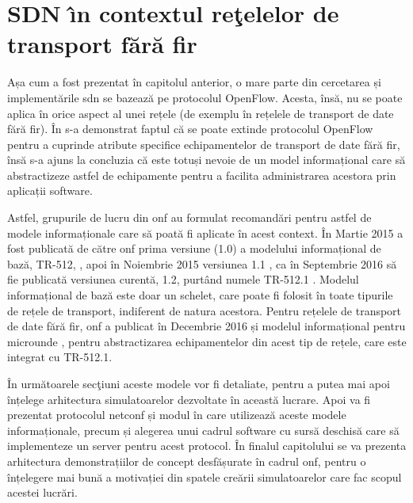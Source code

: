 \chapter{SDN \^{\i}n contextul reţelelor de transport fără fir\label{ch:sdn_in_contextul_wt}}

\graphicspath{ {cap-sdn_in_contextul_wt/figures/} }

Așa cum a fost prezentat în capitolul anterior, o mare parte din cercetarea și implementările \gls{sdn} se bazează pe protocolul OpenFlow. Acesta, însă, nu se poate aplica în orice aspect al unei rețele (de exemplu în rețelele de transport de date fără fir). În \cite{onf2015_poc1} s-a demonstrat faptul că se poate extinde protocolul OpenFlow pentru a cuprinde atribute specifice echipamentelor de transport de date fără fir, însă s-a ajuns la concluzia că este totuși nevoie de un model informațional care să abstractizeze astfel de echipamente pentru a facilita administrarea acestora prin aplicații software. 

Astfel, grupurile de lucru din \gls{onf} au formulat recomandări pentru astfel de modele informaționale care să poată fi aplicate în acest context. În Martie 2015 a fost publicată de către \gls{onf} prima versiune (1.0) a modelului informațional de bază, TR-512, \cite{onftr512v1.0}, apoi în Noiembrie 2015 versiunea 1.1 \cite{onftr512v1.1}, ca în Septembrie 2016 să fie publicată versiunea curentă, 1.2, purtând numele TR-512.1 \cite{onftr512v1.2}. Modelul informațional de bază este doar un schelet, care poate fi folosit în toate tipurile de rețele de transport, indiferent de natura acestora. Pentru rețelele de transport de date fără fir, \gls{onf} a publicat în Decembrie 2016 și modelul informațional pentru microunde \cite{onftr532}, pentru abstractizarea echipamentelor din acest tip de rețele, care este integrat cu TR-512.1. 

În următoarele secţiuni aceste modele vor fi detaliate, pentru a putea mai apoi înțelege arhitectura simulatoarelor dezvoltate în această lucrare. Apoi va fi prezentat protocolul \gls{netconf} și modul în care utilizează aceste modele informaționale, precum și alegerea unui cadrul software cu sursă deschisă care să implementeze un server pentru acest protocol. În finalul capitolului se va prezenta arhitectura demonstrațiilor de concept desfășurate în cadrul \gls{onf}, pentru o înțelegere mai bună a motivației din spatele creării simulatoarelor care fac scopul acestei lucrări.






